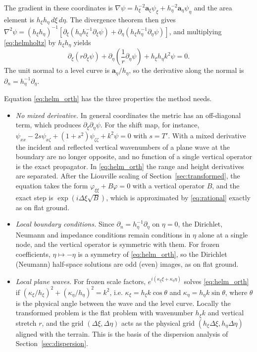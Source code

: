 \documentclass[journal]{IEEEtran}
\newcommand{\pd}{\partial}
\begin{document}
The gradient in these coordinates is
$\nabla\psi=h_\xi^{-2}\mathbf a_\xi\psi_\xi+h_\eta^{-2}\mathbf a_\eta\psi_\eta$
and the area element is $h_\xi h_\eta\,d\xi\,d\eta$. The divergence theorem
then gives
$\nabla^2\psi=(h_\xi h_\eta)^{-1}\left[\pd_\xi(h_\eta h_\xi^{-1}\pd_\xi\psi)+\pd_\eta(h_\xi h_\eta^{-1}\pd_\eta\psi)\right]$,
and multiplying \eqref{eq:helmholtz} by $h_\xi h_\eta$ yields
\begin{equation}\label{eq:helm_orth}
\pd_\xi\left(r\pd_\xi\psi\right)+\pd_\eta\left(\frac{1}{r}\pd_\eta\psi\right)+h_\xi h_\eta k^2\psi=0 .
\end{equation}
The unit normal to a level curve is $\mathbf a_\eta/h_\eta$, so the derivative
along the normal is $\pd_n=h_\eta^{-1}\pd_\eta$.

Equation \eqref{eq:helm_orth} has the three properties the method needs.
\begin{itemize}
\item \emph{No mixed derivative.} In general coordinates the metric has an
off-diagonal term, which produces $\pd_\xi\pd_\eta\psi$. For the shift map,
for instance, $\psi_{xx}-2s\psi_{x\zeta}+(1+s^2)\psi_{\zeta\zeta}+k^2\psi=0$ with
$s=T'$. With a mixed derivative the incident and reflected vertical
wavenumbers of a plane wave at the boundary are no longer opposite, and no
function of a single vertical operator is the exact propagator. In
\eqref{eq:helm_orth} the range and height derivatives are separated. After the
Liouville scaling of Section~\ref{sec:transformed}, the equation takes the
form $\varphi_{\xi\xi}+B\varphi=0$ with a vertical operator $B$, and the exact
step is $\exp(i\Delta\xi\sqrt B)$, which is approximated by \eqref{eq:rational}
exactly as on flat ground.
\item \emph{Local boundary conditions.} Since $\pd_n=h_\eta^{-1}\pd_\eta$ on
$\eta=0$, the Dirichlet, Neumann and impedance conditions remain conditions in
$\eta$ alone at a single node, and the vertical operator is symmetric with
them. For frozen coefficients, $\eta\mapsto-\eta$ is a symmetry of
\eqref{eq:helm_orth}, so the Dirichlet (Neumann) half-space solutions are odd
(even) images, as on flat ground.
\item \emph{Local plane waves.} For frozen scale factors,
$e^{i(\kappa_\xi\xi+\kappa_\eta\eta)}$ solves \eqref{eq:helm_orth} if
$(\kappa_\xi/h_\xi)^2+(\kappa_\eta/h_\eta)^2=k^2$, i.e.
$\kappa_\xi=h_\xi k\cos\theta$ and $\kappa_\eta=h_\eta k\sin\theta$, where
$\theta$ is the physical angle between the wave and the level curve. Locally the
transformed problem is the flat problem with wavenumber $h_\xi k$ and vertical
stretch $r$, and the grid $(\Delta\xi,\Delta\eta)$ acts as the physical grid
$(h_\xi\Delta\xi,h_\eta\Delta\eta)$ aligned with the terrain. This is the basis
of the dispersion analysis of Section~\ref{sec:dispersion}.
\end{itemize}
\end{document}
